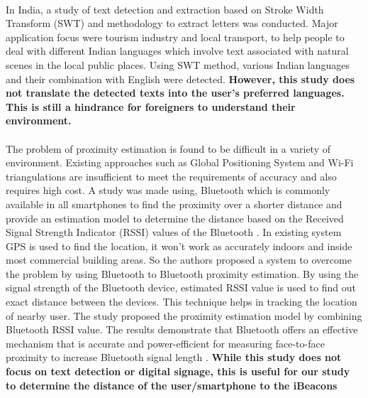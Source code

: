 \documentclass[12pt]{article}
\begin{document}
\paragraph{}In India, a study of text detection and extraction based on Stroke Width Transform (SWT) and methodology to extract letters was conducted. \cite{india} Major application focus were tourism industry and local transport, to help people to deal with different Indian languages which involve text associated with natural scenes in the local public places. Using SWT method, various Indian languages and their combination with English were detected. \textbf{However, this study does not translate the detected texts into the user's preferred languages. This is still a hindrance for foreigners to understand their environment.}

\paragraph{} The problem of proximity estimation is found to be difficult in a variety of environment. Existing approaches such as Global Positioning System and Wi-Fi triangulations are insufficient to meet the requirements of accuracy and also requires high cost. A study was made using, Bluetooth which is commonly available in all smartphones to find the proximity over a shorter distance and provide an estimation model to determine the distance based on the Received Signal Strength Indicator (RSSI) values of the Bluetooth  \cite{distance}. In existing system GPS is used to find the location, it won't work as accurately indoors and inside most commercial building areas. So the authors proposed a system to overcome the problem by using Bluetooth to Bluetooth proximity estimation. By using the signal strength of the Bluetooth device, estimated RSSI value is used to find out exact distance between the devices. This technique helps in tracking the location of nearby user. The study proposed the proximity estimation model by combining Bluetooth RSSI value. The results demonstrate that Bluetooth offers an effective mechanism that is accurate and power-efficient for measuring face-to-face proximity to increase Bluetooth signal length \cite{distance}. \textbf{While this study does not focus on text detection or digital signage, this is  useful for our study to determine the distance of the user/smartphone to the iBeacons} 
\end{document}
